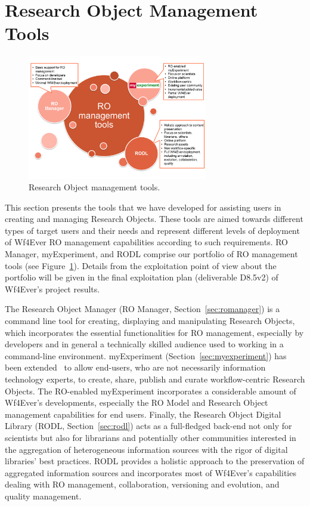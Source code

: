 \section{Research Object Management Tools}
\label{sec:romt}

\begin{figure}
\begin{center}
\includegraphics[width=0.7\textwidth]{Figures/ROManagementTools-exploitation.png}
\end{center}
\caption{Research Object management tools.}
\label{fig:romt}
\end{figure}

This section presents the tools that we have developed for assisting users in creating and managing Research Objects. These tools are aimed towards different types of target users and their needs and represent different levels of deployment of Wf4Ever RO management capabilities according to such requirements. RO Manager, myExperiment, and RODL comprise our portfolio of RO management tools (see Figure~\ref{fig:romt}). Details from the exploitation point of view about the portfolio will be given in the final exploitation plan (deliverable D8.5v2) of Wf4Ever's project results.

The Research Object Manager (RO Manager, Section~\ref{sec:romanager}) is a command line tool for creating, displaying and manipulating Research Objects, which incorporates the essential functionalities for RO management, especially by developers and in general a technically skilled audience used to working in a command-line environment. myExperiment (Section~\ref{sec:myexperiment}) has been extended~\cite{DBLP:journals/fgcs/RoureGS09} to allow end-users, who are not necessarily information technology experts, to create, share, publish and curate workflow-centric Research Objects. The RO-enabled myExperiment incorporates a considerable amount of Wf4Ever's developments, especially the RO Model and Research Object management capabilities for end users. Finally, the Research Object Digital Library (RODL, Section~\ref{sec:rodl}) acts as a full-fledged back-end not only for scientists but also for librarians and potentially other communities interested in the aggregation of heterogeneous information sources with the rigor of digital libraries' best practices. RODL provides a holistic approach to the preservation of aggregated information sources and incorporates most of Wf4Ever's capabilities dealing with RO management, collaboration, versioning and evolution, and quality management. 


